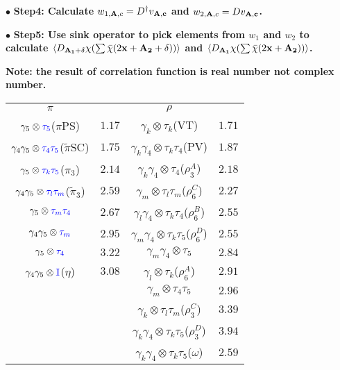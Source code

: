 $\bullet$ \textbf{Step4: Calculate $w_{1,{\bf A},c}=D^{\dagger}v _{\bf A, c}$ and $w_{2,{\bf A},c}=Dv _{\bf A, c}$.}

$\bullet$ \textbf{Step5: Use sink operator to pick elements from $w_1$ and $w_2$ to calculate $\langle D_{\bf A_1+\delta}\chi (\sum \bar{\chi}(2{\bf x}+{\bf A_2}+\delta))\rangle$ and $\langle D_{\bf A_1}\chi (\sum \bar{\chi}(2{\bf x}+{\bf A_2}))\rangle$.}

\textcolor[rgb]{0,0,1}{\textbf{Note: the result of correlation function is real number not complex number.}}


\begin{table}
\begin{center}
\begin{tabular}{cc|cc}
\hline
 $\pi$ & & $\rho$ & \\
$\gamma_5 \otimes \textcolor[rgb]{0,0,1}{\tau _5}$($\pi$PS) & $1.17$ & $\gamma_k\otimes \tau_k$(VT) & $1.71$ \\
$\gamma _4\gamma _5\otimes \textcolor[rgb]{0,0,1}{\tau _4\tau _5}$($\tilde{\pi}$SC) & $1.75$ & $\gamma_k\gamma_4\otimes \tau_k\tau_4$(PV) & $1.87$ \\
$\gamma_5 \otimes \textcolor[rgb]{0,0,1}{\tau _k\tau _5}$($\pi_3$) & $2.14$ & $\gamma_k\gamma _4\otimes \tau_4$($\rho_3^A$) & $2.18$ \\
$\gamma _4\gamma_5 \otimes \textcolor[rgb]{0,0,1}{\tau _l\tau _m}$($\tilde{\pi}_3$) & $2.59$ & $\gamma_m\otimes \tau _l\tau_m$($\rho_6^C$) & $2.27$ \\
$\gamma_5 \otimes \textcolor[rgb]{0,0,1}{\tau _m\tau _4}$ & $2.67$ & $\gamma_l\gamma _4\otimes \tau_k\tau _4$($\rho_6^B$) & $2.55$ \\
$\gamma _4\gamma_5 \otimes \textcolor[rgb]{0,0,1}{\tau _m}$ & $2.95$ & $\gamma_m\gamma _4\otimes \tau _k\tau_5$($\rho_6^D$) & $2.55$\\
$\gamma_5 \otimes \textcolor[rgb]{0,0,1}{\tau _4}$ & $3.22$ & $\gamma_m\gamma _4\otimes \tau_5$ & $2.84$\\
$\gamma _4\gamma_5 \otimes \textcolor[rgb]{0,0,1}{\mathbb{I}}$($\eta$) & $3.08$ & $\gamma_l\otimes \tau_k$($\rho_6^A$) & $2.91$ \\
 & & $\gamma_m\otimes \tau _4\tau_5$ & $2.96$ \\
 & & $\gamma_k\otimes \tau_l\tau _m$($\rho_3^C$) & $3.39$ \\
 & & $\gamma_k\gamma _4\otimes \tau_k\tau _5$($\rho_3^D$) & $3.94$ \\
 & & $\gamma_k\gamma _4\otimes \tau_k\tau _5$($\omega$) & $2.59$ \\

\end{tabular}
\end{center}
\end{table}
